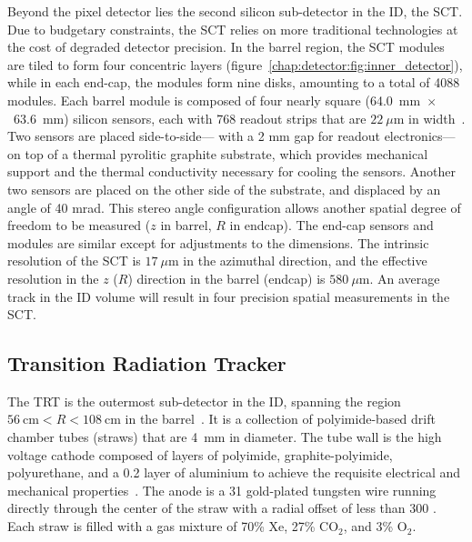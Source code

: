 Beyond the pixel detector lies the second silicon sub-detector in the
ID, the SCT. Due to budgetary constraints, the SCT relies on more
traditional technologies at the cost of degraded detector precision. In the
barrel region, the SCT modules are tiled to form four concentric
layers (figure~\ref{chap:detector:fig:inner_detector}), while in each
end-cap, the modules form nine disks, amounting to a total of 4088
modules. Each barrel module is composed of four nearly square
(64.0~mm~$\times$~63.6~mm) silicon
sensors, each with 768 readout strips that are $22~\mu\textrm{m}$ in
width~\cite{bib:Abdesselam:2006wt}. Two sensors are placed
side-to-side--- with a 2 mm gap for readout electronics--- on top of a
thermal pyrolitic graphite substrate, which provides mechanical
support and the thermal conductivity necessary for cooling the
sensors. Another two sensors are placed on the other side of the
substrate, and displaced by an angle of 40 mrad. This stereo angle
configuration allows another spatial degree of freedom to be
measured ($z$ in barrel, $R$ in endcap). The end-cap sensors and
modules are similar except for adjustments to the dimensions. The
intrinsic resolution of the SCT is $17~\mu\textrm{m}$ in
the azimuthal direction, and the effective resolution in the $z$ ($R$)
direction in the barrel (endcap) is $580~\mu\textrm{m}$. An average
track in the ID volume will result in four precision spatial
measurements in the SCT. 

\subsection{Transition Radiation Tracker}

The TRT is the outermost sub-detector in the ID, spanning the region
$56~\textrm{cm} < R < 108~\textrm{cm}$ in the
barrel~\cite{bib:Abat:2008zzb}. It is a collection of polyimide-based
drift chamber tubes (straws) that are 4~mm in diameter. The tube wall is the high
voltage cathode composed of layers of polyimide, graphite-polyimide,
polyurethane, and a 0.2 \micron layer of aluminium to achieve the
requisite electrical and mechanical properties~\cite{bib:Aad:2008zzm}. The anode is a
31 \micron gold-plated tungsten wire running directly through the
center of the straw with a radial offset of less than
300 \micron. Each straw is filled with a gas mixture of 70\% Xe, 27\%
CO$_2$, and 3\% O$_2$. 

